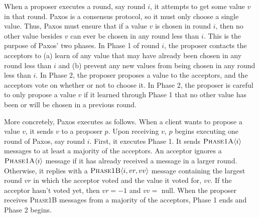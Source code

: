{}

When a proposer executes a round, say round $i$, it attempts to get some value
%
$v$  in that round.  Paxos is a
consensus protocol, so it must only choose a single value. Thus, Paxos must
ensure that if a value $v$ is chosen in round $i$, then no other value besides
$v$ can ever be chosen in any round less than $i$. This is the purpose of
Paxos' two phases. In Phase 1 of round $i$, the proposer contacts the acceptors
to (a) learn of any value that may have already been chosen in any round less
than $i$ and (b) prevent any new values from being chosen in any round less
than $i$. In Phase 2, the proposer proposes a value to the acceptors, and the
acceptors vote on whether or not to choose it.  In Phase 2, the proposer is
careful to only propose a value $v$ if it learned through Phase 1 that no other
value has been or will be chosen in a previous round.

More concretely, Paxos executes as follows. When a client wants to propose a
value $v$, it sends $v$ to a proposer $p$. Upon receiving $v$, $p$ begins
executing one round of Paxos, say round $i$. First, it executes Phase 1. It
sends $\textsc{Phase1A}\langle{i}\rangle$ messages to at least a majority of the acceptors. An
acceptor ignores a $\textsc{Phase1A}\langle{i}\rangle$ message if it has already received a message
in a larger round. Otherwise, it replies with a $\textsc{Phase1B}\langle{i, vr, vv}\rangle$ message
containing the largest round $vr$ in which the acceptor voted and the value it
voted for, $vv$. If the acceptor hasn't voted yet, then $vr = -1$ and $vv = $
\textsf{null}. When the proposer receives \textsc{Phase1B} messages from a
majority of the acceptors, Phase 1 ends and Phase 2 begins.


